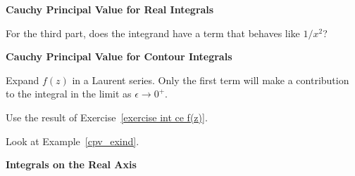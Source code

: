 {%
\begin{Hint}
  \label{hint e^z/((z-pi)tan(z))}
\end{Hint}








\begin{large}
  \noindent
  \textbf{Cauchy Principal Value for Real Integrals}
\end{large}




\begin{Hint}
\end{Hint}



\begin{Hint}
  \label{hint cpv 1/x^2}
  For the third part, does the integrand have a term that behaves like
  $1/x^2$?
\end{Hint}



\begin{large}
  \noindent
  \textbf{Cauchy Principal Value for Contour Integrals}
\end{large}



\begin{Hint}
  \label{hint int ce f(z)}
  Expand $f(z)$ in a Laurent series.  Only the first term will make
  a contribution to the integral in the limit as $\epsilon \to 0^+$.
\end{Hint}



\begin{Hint}
  \label{hint cpv res thrm}
  Use the result of Exercise~\ref{exercise int ce f(z)}.
\end{Hint}



\begin{Hint}
  \label{hint 1/(z-1)}
  Look at Example~\ref{cpv_exind}.
\end{Hint}




\begin{large}
  \noindent
  \textbf{Integrals on the Real Axis}
\end{large}




}
